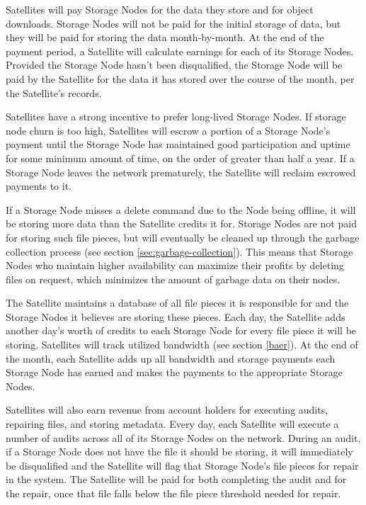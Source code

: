 \documentclass[8pt,fleqn,openany]{book}
\begin{document}
Satellites will pay Storage Nodes for the data they store
and for object downloads.
Storage Nodes will not be paid for the initial storage of data, but they
will be paid for storing the data month-by-month. At the end of the payment
period, a Satellite will calculate earnings for each of its Storage Nodes.
Provided the Storage Node hasn't been disqualified,
the Storage Node will be paid by the Satellite for the data it has stored
over the course of
the month, per the Satellite's records.

Satellites have a strong incentive to prefer long-lived Storage Nodes. If
storage node churn is too high, Satellites will escrow a portion of a Storage
Node's payment until the Storage Node has maintained good participation and
uptime for some minimum amount of time, on the order of greater than half a year.
If a Storage Node leaves the network prematurely, the Satellite will reclaim
escrowed payments to it.

If a Storage Node misses a delete command due to the Node being
offline, it will be storing more data than the Satellite credits it for.
Storage Nodes are not paid for storing such file pieces, but
will eventually be cleaned up through the garbage collection process
(see section \ref{sec:garbage-collection}).
This means that Storage Nodes who maintain higher availability
can maximize their profits by deleting files on request,
which minimizes the amount
of garbage data on their nodes.

The Satellite maintains a database of all file pieces it is responsible for
and the Storage Nodes it believes are storing these pieces. Each day,
the Satellite adds another day's worth
of credits to each Storage Node for every file
piece
it will be storing.
Satellites will track utilized bandwidth (see section \ref{baer}).
At the end of the month, each Satellite
adds up all bandwidth and storage payments each Storage Node has earned and
makes
the payments to the appropriate Storage Nodes.

Satellites will also earn revenue from account holders for executing audits,
repairing files, and storing metadata. Every day, each Satellite will execute
a number of audits across all of its Storage Nodes on the network. During an
audit,
if a Storage Node does not have the file it should be storing, it will
immediately be disqualified and
the Satellite will flag that Storage Node's file pieces for
repair
in the system.
The Satellite will be paid for both completing the audit
and for the repair,
once that file falls below the file piece threshold needed for
repair.
\end{document}
